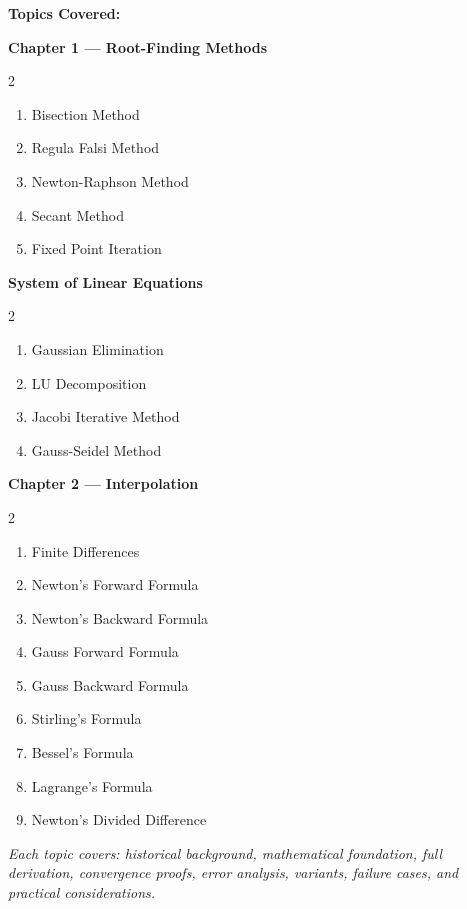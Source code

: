 \documentclass[12pt]{article}
\begin{document}
\vspace{16pt}

\begin{tcolorbox}[colback=lightbg, colframe=accent, arc=4pt, boxrule=1pt,
  left=12pt, right=12pt, top=10pt, bottom=10pt]
\textbf{\color{primary}Topics Covered:}

\medskip
\textcolor{accent}{\bfseries Chapter 1 — Root-Finding Methods}
\begin{multicols}{2}
\begin{enumerate}[noitemsep]
  \item Bisection Method
  \item Regula Falsi Method
  \item Newton-Raphson Method
  \item Secant Method
  \item Fixed Point Iteration
\end{enumerate}
\end{multicols}

\medskip
\textcolor{accent}{\bfseries System of Linear Equations}
\begin{multicols}{2}
\begin{enumerate}[noitemsep]
  \item Gaussian Elimination
  \item LU Decomposition
  \item Jacobi Iterative Method
  \item Gauss-Seidel Method
\end{enumerate}
\end{multicols}

\medskip
\textcolor{accent}{\bfseries Chapter 2 — Interpolation}
\begin{multicols}{2}
\begin{enumerate}[noitemsep]
  \item Finite Differences
  \item Newton's Forward Formula
  \item Newton's Backward Formula
  \item Gauss Forward Formula
  \item Gauss Backward Formula
  \item Stirling's Formula
  \item Bessel's Formula
  \item Lagrange's Formula
  \item Newton's Divided Difference
\end{enumerate}
\end{multicols}
\vspace{4pt}
\textit{\small Each topic covers: historical background, mathematical foundation, full derivation, convergence proofs, error analysis, variants, failure cases, and practical considerations.}
\end{tcolorbox}
\end{document}
